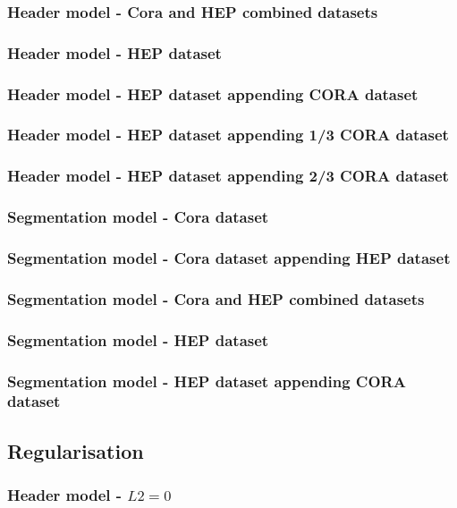 \documentclass[10pt, oneside]{scrartcl}   	%
\begin{document}
\subsubsection{Header model - Cora and HEP combined datasets}
\subsubsection{Header model - HEP dataset}
\subsubsection{Header model - HEP dataset appending CORA dataset}
\subsubsection{Header model - HEP dataset appending 1/3 CORA dataset}
\subsubsection{Header model - HEP dataset appending 2/3 CORA dataset}
\subsubsection{Segmentation model - Cora dataset}
\subsubsection{Segmentation model - Cora dataset appending HEP dataset}
\subsubsection{Segmentation model - Cora and HEP combined datasets}
\subsubsection{Segmentation model - HEP dataset}
\subsubsection{Segmentation model - HEP dataset appending CORA dataset}
\subsection{Regularisation}
\subsubsection{Header model - $L2 = 0$}
\end{document}
